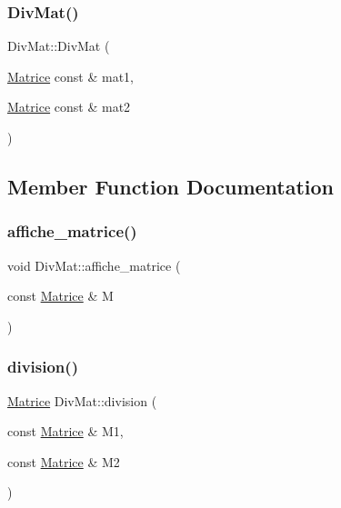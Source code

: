 \subsubsection{\texorpdfstring{Div\+Mat()}{DivMat()}}
{\footnotesize\ttfamily Div\+Mat\+::\+Div\+Mat (\begin{DoxyParamCaption}\item[{\mbox{\hyperlink{_div_mat_8h_a5cd1306cd22bb9a4a8d8b6ead3f49a08}{Matrice}} const \&}]{mat1,  }\item[{\mbox{\hyperlink{_div_mat_8h_a5cd1306cd22bb9a4a8d8b6ead3f49a08}{Matrice}} const \&}]{mat2 }\end{DoxyParamCaption})}



\subsection{Member Function Documentation}
\mbox{\label{class_div_mat_af3502186db9e2cee9e0ab7997be66b31}} 
\subsubsection{\texorpdfstring{affiche\+\_\+matrice()}{affiche\_matrice()}}
{\footnotesize\ttfamily void Div\+Mat\+::affiche\+\_\+matrice (\begin{DoxyParamCaption}\item[{const \mbox{\hyperlink{_div_mat_8h_a5cd1306cd22bb9a4a8d8b6ead3f49a08}{Matrice}} \&}]{M }\end{DoxyParamCaption})}

\mbox{\label{class_div_mat_abb9517be4c8a45a8b958941aa8893e97}} 
\subsubsection{\texorpdfstring{division()}{division()}}
{\footnotesize\ttfamily \mbox{\hyperlink{_div_mat_8h_a5cd1306cd22bb9a4a8d8b6ead3f49a08}{Matrice}} Div\+Mat\+::division (\begin{DoxyParamCaption}\item[{const \mbox{\hyperlink{_div_mat_8h_a5cd1306cd22bb9a4a8d8b6ead3f49a08}{Matrice}} \&}]{M1,  }\item[{const \mbox{\hyperlink{_div_mat_8h_a5cd1306cd22bb9a4a8d8b6ead3f49a08}{Matrice}} \&}]{M2 }\end{DoxyParamCaption})}

